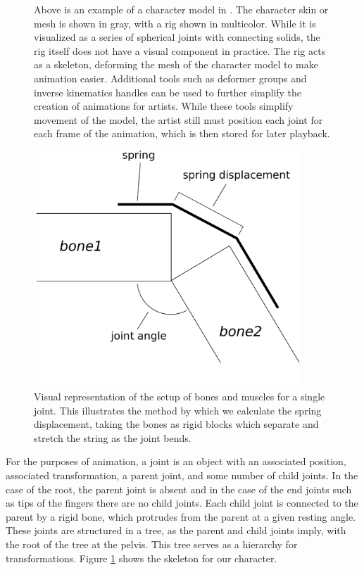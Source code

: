 \begin{figure}[htp]
\begin{subfigure}[b]{0.3\textwidth}
	\end{subfigure}
	\caption[Example of Rigged 3D Character Model]{Above is an example of a character model in \maya{}.  The character skin or mesh is shown in gray, with a rig shown in multicolor.  While it is visualized as a series of spherical joints with connecting solids, the rig itself does not have a visual component in practice.  The rig acts as a skeleton, deforming the mesh of the character model to make animation easier.  Additional tools such as deformer groups and inverse kinematics handles can be used to further simplify the creation of animations for artists.  While these tools simplify movement of the model, the artist still must position each joint for each frame of the animation, which is then stored for later playback.}
	\label{fig:rig_character}
\end{figure}

\begin{figure}[ht]
	\centering
	\includegraphics[width=10cm]{images/spring_calc/spring_angle_calc.eps}
	\caption[Diagram of muscle setup]{Visual representation of the setup of bones and muscles for a single joint.  This illustrates the method by which we calculate the spring displacement, taking the bones as rigid blocks which separate and stretch the string as the joint bends.}
	\label{fig:forceCalc}
\end{figure}

For the purposes of animation, a joint is an object with an associated position, associated transformation, a parent joint, and some number of child joints.  In the case of the root, the parent joint is absent and in the case of the end joints such as tips of the fingers there are no child joints.  Each child joint is connected to the parent by a rigid bone, which protrudes from the parent at a given resting angle.  These joints are structured in a tree, as the parent and child joints imply, with the root of the tree at the pelvis.  This tree serves as a hierarchy for transformations.  Figure \ref{fig:rig_character} shows the skeleton for our character.

